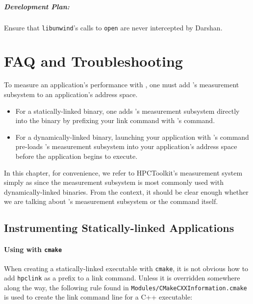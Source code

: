 \documentclass[11pt,twoside,letterpaper]{report}
\begin{document}
\paragraph{Development Plan:} Ensure that \verb|libunwind|'s calls to \verb|open| are never intercepted by Darshan.



\cleardoublepage
\chapter{FAQ and Troubleshooting}
\label{chpt:faq-troubleshooting}

To measure an application's performance with \HPCToolkit, one must add
\HPCToolkit's measurement subsystem to an application's address
space.
\begin{itemize}
\item
For a statically-linked binary, one adds \HPCToolkit's
measurement subsystem directly into the binary
by prefixing your link command
with \HPCToolkit{}'s \hpclink{} command.
\item
For a dynamically-linked
binary, launching your application with \HPCToolkit's \hpcrun{}
command pre-loads \HPCToolkit's measurement subsystem into your
application's address space before the application begins to execute.
\end{itemize}
In this chapter, for convenience, we refer to HPCToolkit's measurement
system simply as \hpcrun{} since the measurement subsystem is most commonly used
with dynamically-linked binaries. From the context, it should be clear enough
whether we are talking about \HPCToolkit's measurement subsystem
or the \hpcrun{} command itself.

\section{Instrumenting Statically-linked Applications}

\subsubsection{Using \hpclink{} with {\tt cmake}}

When creating a statically-linked executable with {\tt cmake}, it is not obvious how to add {\tt hpclink} as a prefix to a link command. Unless it is overridden somewhere  along the way, the following rule found in {\tt Modules/CMakeCXXInformation.cmake} is
used to create the link command line for a C++ executable:
\end{document}

